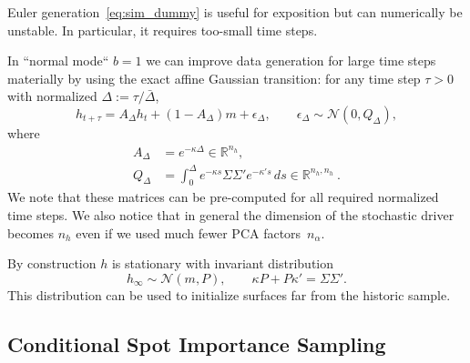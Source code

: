 \documentclass[11pt,a4paper]{article}
\newcommand{\R}{\mathbb{R}}
\begin{document}
Euler generation~\eqref{eq:sim_dummy} is useful for exposition but can numerically be unstable. 
In particular, it requires too-small time steps.

In ``normal mode`` $b=1$ we can improve data generation for large time steps materially
by using the exact affine Gaussian transition: for any time step $\tau>0$ with normalized $\Delta:=\tau/\bar \Delta$,
\begin{equation}\label{eq:sim}
    h_{t+\tau}=A_\Delta h_t+(1- A_\Delta)m +\epsilon_\Delta,
    \qquad \epsilon_\Delta\sim\mathcal N(0,Q_\Delta),
\end{equation}
where
\begin{equation}\label{eq:matrix_exp_terms}
\begin{split}
    A_\Delta&=e^{-\kappa\Delta} \in \R^{n_h},\\
    Q_\Delta&=\int_0^\Delta e^{-\kappa s}
        \Sigma\Sigma'e^{-\kappa's}\,ds \in \R^{n_h,n_h} \ .
\end{split}
\end{equation}
We note that these matrices can be pre-computed for all required normalized time steps. We also notice
that in general the dimension of the stochastic driver becomes $n_h$ even if we used much
fewer PCA factors~$n_\alpha$.

By construction $h$ is stationary with invariant distribution
\begin{equation}\label{eq:invariant_surface}
    h_\infty\sim\mathcal N(m,P),\qquad
    \kappa P+P\kappa'=\Sigma\Sigma'.
\end{equation}
This distribution can be used to initialize surfaces far from the historic
sample. 

\subsection{Conditional Spot Importance Sampling}\label{sec:importance}
\end{document}
